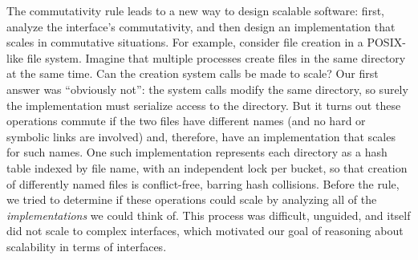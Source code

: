 The commutativity rule leads to a new way to design scalable
software:
%
first, analyze the interface's commutativity, and then design an
implementation that
scales in commutative situations.
%
For example,
consider file creation in a POSIX-like file system. Imagine that
multiple processes create files in the same directory at the same
time. Can the creation system calls be made to scale? Our
first answer was ``obviously not'': the system calls modify the same
directory, so surely the implementation must
serialize access to the directory. But it turns
out these operations commute if the two files have different names
(and no hard or symbolic links are involved) and, therefore, have an
implementation that scales for such names.
One such implementation represents each directory as a hash table
indexed by file name, with an independent lock per bucket,
so that creation of differently named files is conflict-free, barring
hash collisions.
%
Before the rule, we tried to determine if these
operations could scale by analyzing all of the \emph{implementations}
we could think
of.  This process was difficult, unguided, and itself did not scale to
complex interfaces, which
motivated our goal of reasoning about
scalability in terms of interfaces.


